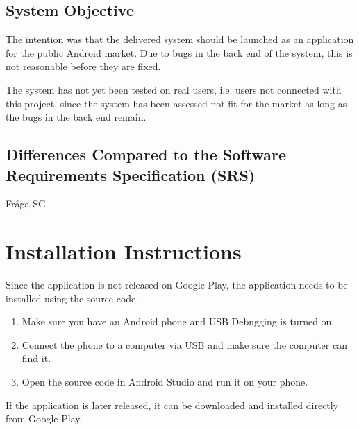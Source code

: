 \documentclass[a4paper]{article}
\begin{document}
\subsection{System Objective}
The intention was that the delivered system should be launched as an application for the public Android market. Due to bugs in the back end of the system, this is not reasonable before they are fixed. 

The system has not yet been tested on real users, i.e. users not connected with this project, since the system has been assessed not fit for the market as long as the bugs in the back end remain.  

\subsection{Differences Compared to the Software Requirements Specification (SRS)}
Fråga SG


\section{Installation Instructions}
Since the application is not released on Google Play, the application needs to be installed using the source code. 

\begin{enumerate}
\item Make sure you have an Android phone and USB Debugging is turned on.
\item Connect the phone to a computer via USB and make sure the computer can find it.
\item Open the source code in Android Studio and run it on your phone.
\end{enumerate}

If the application is later released, it can be downloaded and installed directly from Google Play.
\end{document}
